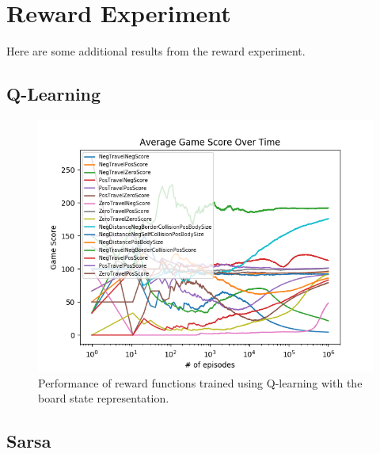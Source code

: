 \documentclass[result.tex]{subfiles}
\begin{document}
    \clearpage
    \appendix

    \section{Reward Experiment}

    Here are some additional results from the reward experiment.

    \subsection{Q-Learning}

    \begin{figure}[ht]
        \centering
        \includegraphics[width=\linewidth]{../images/qlearning/reward/234/board_state_average_game_score_over_time.png}
        \caption{Performance of reward functions trained using Q-learning with the board state representation.}
        \label{fig:app_reward_qlearning}
    \end{figure}

    \newpage

    \subsection{Sarsa}
\end{document}
